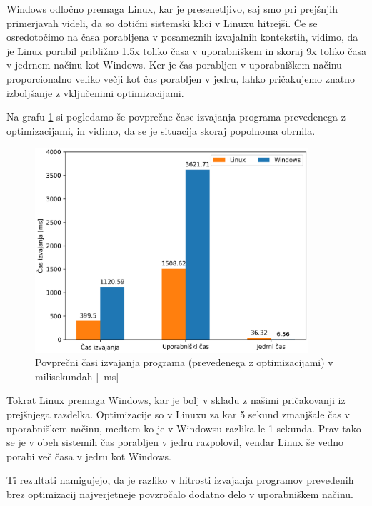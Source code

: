 \documentclass[a4paper,12pt,openright]{book}
\begin{document}
Windows odločno premaga Linux, kar je presenetljivo, saj smo pri prejšnjih primerjavah videli, da so dotični sistemski klici v Linuxu hitrejši.
Če se osredotočimo na časa porabljena v posameznih izvajalnih kontekstih, vidimo, da je Linux porabil približno 1.5x toliko časa v uporabniškem in skoraj 9x toliko časa v jedrnem načinu kot Windows.
Ker je čas porabljen v uporabniškem načinu proporcionalno veliko večji kot čas porabljen v jedru, lahko pričakujemo znatno izboljšanje z vključenimi optimizacijami.

Na grafu \ref{fig:program_comparison:optimized_times} si pogledamo še povprečne čase izvajanja programa prevedenega z optimizacijami, in vidimo, da se je situacija skoraj popolnoma obrnila.

\begin{figure}[h!]
	\begin{center}
		\includegraphics[width=0.9\textwidth]{images/program_comparison_optimized.png}
	\end{center}
	\caption{Povprečni časi izvajanja programa (prevedenega z optimizacijami) v milisekundah [\SI{}{\milli\second}]}
	\label{fig:program_comparison:optimized_times}
\end{figure}

Tokrat Linux premaga Windows, kar je bolj v skladu z našimi pričakovanji iz prejšnjega razdelka.
Optimizacije so v Linuxu za kar 5 sekund zmanjšale čas v uporabniškem načinu, medtem ko je v Windowsu razlika le 1 sekunda.
Prav tako se je v obeh sistemih čas porabljen v jedru razpolovil, vendar Linux še vedno porabi več časa v jedru kot Windows.

Ti rezultati namigujejo, da je razliko v hitrosti izvajanja programov prevedenih brez optimizacij najverjetneje povzročalo dodatno delo v uporabniškem načinu.
\end{document}
